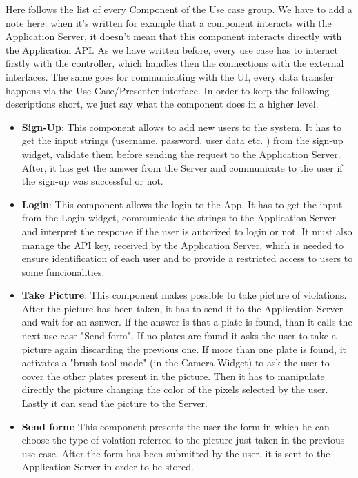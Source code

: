 Here follows the list of every Component of the Use case group. We have to add a note here: when it's written for example that a component interacts with the Application Server, it doesn't mean that this component interacts directly with the Application API. As we have written before, every use case has to interact firstly with the controller, which handles then the connections with the external interfaces. The same goes for communicating with the UI, every data transfer happens via the Use-Case/Presenter interface. In order to keep the following descriptions short, we just say what the component does in a higher level.

\begin{itemize}
  \item \textbf{Sign-Up}: This component allows to add new users to the system. It has to get the input strings (username, password, user data etc. ) from the sign-up widget, validate them before sending the request to the Application Server. After, it has get the answer from the Server and communicate to the user if the sign-up was successful or not.
  \item \textbf{Login}: This component allows the login to the App. It has to get the input from the Login widget, communicate the strings to the Application Server and interpret the response if the user is autorized to login or not. It must also manage the API key, received by the Application Server, which is needed to ensure identification of each user and to provide a restricted access to users to some funcionalities.
  \item \textbf{Take Picture}: This component makes possible to take picture of violations. After the picture has been taken, it has to send it to the Application Server and wait for an asnwer. If the answer is that a plate is found, than it calls the next use case "Send form". If no plates are found it asks the user to take a picture again discarding the previous one. If more than one plate is found, it activates a "brush tool mode" (in the Camera Widget) to ask the user to cover the other plates present in the picture. Then it has to manipulate directly the picture changing the color of the pixels selected by the user. Lastly it can send the picture to the Server.
  \item \textbf{Send form}: This component presents the user the form in which he can choose the type of volation referred to the picture just taken in the previous use case. After the form has been submitted by the user, it is sent to the Application Server in order to be stored.

\end{itemize}
